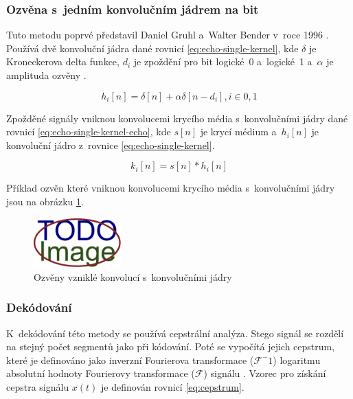 \subsubsection*{Ozvěna s~jedním konvolučním jádrem na bit}
\label{ssub:echo-single-kernel}

Tuto metodu poprvé představil Daniel Gruhl a~Walter Bender v~roce 1996
\cite{Gruhl1996}. Používá dvě konvoluční jádra dané rovnicí
\ref{eq:echo-single-kernel}, kde $\delta$ je Kroneckerova delta funkce, $d_i$
je zpoždění pro bit logické~0 a~logické~1 a~$\alpha$ je amplituda ozvěny
\cite{Dutta2020}.

\begin{equation}
    \label{eq:echo-single-kernel}
    h_i[n] = \delta[n] + \alpha\delta[n - d_i], i \in {0, 1}
\end{equation}

\noindent Zpožděné signály vniknou konvolucemi krycího média s~konvolučními
jádry dané rovnicí \ref{eq:echo-single-kernel-echo}, kde $s[n]$ je krycí médium
a~$h_i[n]$ je konvoluční jádro z~rovnice \ref{eq:echo-single-kernel}.

\begin{equation}
    \label{eq:echo-single-kernel-echo}
    k_i[n] = s[n] * h_i[n]
\end{equation}

\noindent Příklad ozvěn které vniknou konvolucemi krycího média s~konvolučními
jádry jsou na obrázku \ref{pic:echo-single-kernel-echo}.

\begin{figure}[hbt]
    \centering
    \includegraphics[width=0.3\textwidth]{obrazky/placeholder.pdf}
    \caption{Ozvěny vzniklé konvolucí s~konvolučními jádry}
    \label{pic:echo-single-kernel-echo}
\end{figure}

\subsubsection*{Dekódování}
\label{ssub:echo-single-kernel-decoding}

K~dekódování této metody se používá cepstrální analýza. Stego signál se rozdělí
na stejný počet segmentů jako při kódování. Poté se vypočítá jejich cepstrum,
které je definováno jako inverzní Fourierova transformace ($\mathcal{F}^-1$)
logaritmu absolutní hodnoty Fourierovy transformace ($\mathcal{F}$) signálu
\cite{Tekeli2017}. Vzorec pro získání cepstra signálu $x(t)$ je definován
rovnicí \ref{eq:cepstrum}.


